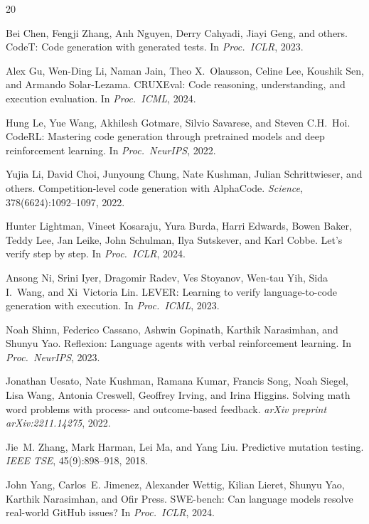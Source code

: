 \documentclass[11pt,a4paper]{article}
\begin{document}
\begin{thebibliography}{20}

Bei Chen, Fengji Zhang, Anh Nguyen, Derry Cahyadi, Jiayi Geng, and others.
\newblock CodeT: Code generation with generated tests.
\newblock In \emph{Proc.\ ICLR}, 2023.

Alex Gu, Wen-Ding Li, Naman Jain, Theo X.\ Olausson, Celine Lee, Koushik Sen, and Armando Solar-Lezama.
\newblock CRUXEval: Code reasoning, understanding, and execution evaluation.
\newblock In \emph{Proc.\ ICML}, 2024.

Hung Le, Yue Wang, Akhilesh Gotmare, Silvio Savarese, and Steven C.H.\ Hoi.
\newblock CodeRL: Mastering code generation through pretrained models and deep reinforcement learning.
\newblock In \emph{Proc.\ NeurIPS}, 2022.

Yujia Li, David Choi, Junyoung Chung, Nate Kushman, Julian Schrittwieser, and others.
\newblock Competition-level code generation with AlphaCode.
\newblock \emph{Science}, 378(6624):1092--1097, 2022.

Hunter Lightman, Vineet Kosaraju, Yura Burda, Harri Edwards, Bowen Baker, Teddy Lee, Jan Leike, John Schulman, Ilya Sutskever, and Karl Cobbe.
\newblock Let's verify step by step.
\newblock In \emph{Proc.\ ICLR}, 2024.

Ansong Ni, Srini Iyer, Dragomir Radev, Ves Stoyanov, Wen-tau Yih, Sida I.\ Wang, and Xi~Victoria Lin.
\newblock LEVER: Learning to verify language-to-code generation with execution.
\newblock In \emph{Proc.\ ICML}, 2023.

Noah Shinn, Federico Cassano, Ashwin Gopinath, Karthik Narasimhan, and Shunyu Yao.
\newblock Reflexion: Language agents with verbal reinforcement learning.
\newblock In \emph{Proc.\ NeurIPS}, 2023.

Jonathan Uesato, Nate Kushman, Ramana Kumar, Francis Song, Noah Siegel, Lisa Wang, Antonia Creswell, Geoffrey Irving, and Irina Higgins.
\newblock Solving math word problems with process- and outcome-based feedback.
\newblock \emph{arXiv preprint arXiv:2211.14275}, 2022.

Jie~M. Zhang, Mark Harman, Lei Ma, and Yang Liu.
\newblock Predictive mutation testing.
\newblock \emph{IEEE TSE}, 45(9):898--918, 2018.

John Yang, Carlos~E. Jimenez, Alexander Wettig, Kilian Lieret, Shunyu Yao, Karthik Narasimhan, and Ofir Press.
\newblock SWE-bench: Can language models resolve real-world GitHub issues?
\newblock In \emph{Proc.\ ICLR}, 2024.

\end{thebibliography}
\end{document}
